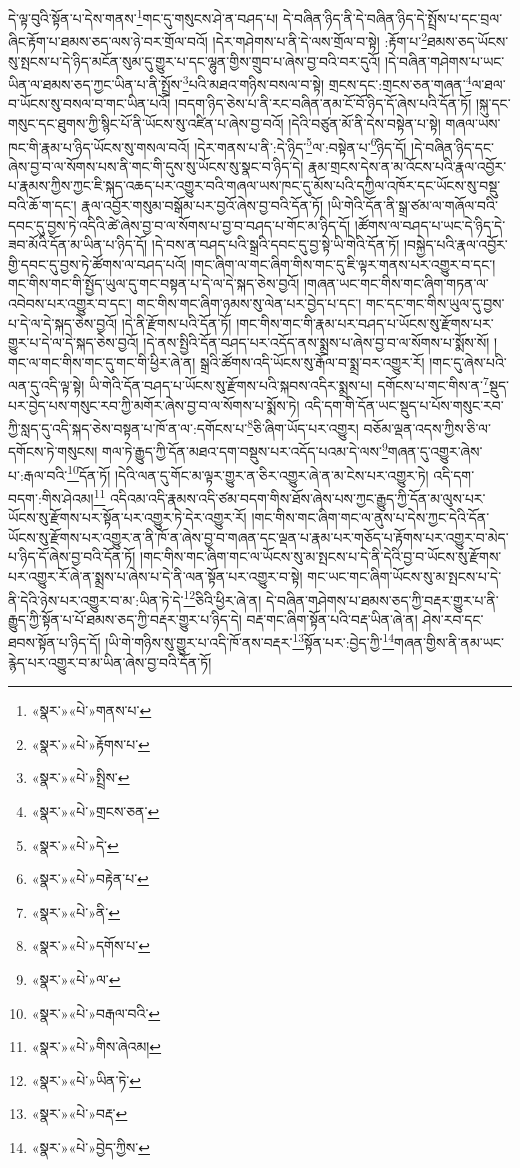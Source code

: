 དེ་ལྟ་བུའི་སྟོན་པ་དེས་གནས་\footnote{«སྣར་»«པེ་»གནས་པ་}གང་དུ་གསུངས་ཤེ་ན་བཤད་པ། དེ་བཞིན་ཉིད་ནི་དེ་བཞིན་ཉིད་དེ་སྤྲོས་པ་དང་བྲལ་ཞིང་རྟོག་པ་ཐམས་ཅད་ལས་ཉེ་བར་གྲོལ་བའོ། །དེར་གཤེགས་པ་ནི་དེ་ལས་གྲོལ་བ་སྟེ། :རྟོག་པ་\footnote{«སྣར་»«པེ་»རྟོགས་པ་}ཐམས་ཅད་ཡོངས་སུ་སྤངས་པ་དེ་ཉིད་མངོན་སུམ་དུ་གྱུར་པ་དང་ལྷུན་གྱིས་གྲུབ་པ་ཞེས་བྱ་བའི་བར་དུའོ། །དེ་བཞིན་གཤེགས་པ་ཡང་ཡིན་ལ་ཐམས་ཅད་ཀྱང་ཡིན་པ་ནི་སྤྲོས་\footnote{«སྣར་»«པེ་»སྤྲིས་}པའི་མཐའ་གཉིས་བསལ་བ་སྟེ། གྲངས་དང་:གྲངས་ཅན་གཞན་\footnote{«སྣར་»«པེ་»གྲངས་ཅན་}ལ་ཐལ་བ་ཡོངས་སུ་བསལ་བ་གང་ཡིན་པའོ། །བདག་ཉིད་ཅེས་པ་ནི་རང་བཞིན་ནམ་ངོ་བོ་ཉིད་དོ་ཞེས་པའི་དོན་ཏོ། །སྐུ་དང་གསུང་དང་ཐུགས་ཀྱི་སྙིང་པོ་ནི་ཡོངས་སུ་འཛིན་པ་ཞེས་བྱ་བའོ། །དེའི་བཙུན་མོ་ནི་དེས་བསྟེན་པ་སྟེ། གཞལ་ཡས་ཁང་གི་རྣམ་པ་ཉིད་ཡོངས་སུ་གསལ་བའོ། །དེར་གནས་པ་ནི་:དེ་ཉིད་\footnote{«སྣར་»«པེ་»དེ་}ལ་:བསྟེན་པ་\footnote{«སྣར་»«པེ་»བརྟེན་པ་}ཉིད་དོ། །དེ་བཞིན་ཉིད་དང་ཞེས་བྱ་བ་ལ་སོགས་པས་ནི་གང་གི་དུས་སུ་ཡོངས་སུ་སྣང་བ་ཉིད་དེ། རྣམ་གྲངས་དེས་ན་མ་འོངས་པའི་རྣལ་འབྱོར་པ་རྣམས་ཀྱིས་ཀྱང་ཇི་སྐད་འཆད་པར་འགྱུར་བའི་གཞལ་ཡས་ཁང་དུ་མོས་པའི་དཀྱིལ་འཁོར་དང་ཡོངས་སུ་བསྡུ་བའི་ཆོ་ག་དང་། རྣལ་འབྱོར་གསུམ་བསྒོམ་པར་བྱའོ་ཞེས་བྱ་བའི་དོན་ཏོ། །ཡི་གེའི་དོན་ནི་སྒྲ་ཙམ་ལ་གཞོལ་བའི་དབང་དུ་བྱས་ཏེ་འདིའི་ཚེ་ཞེས་བྱ་བ་ལ་སོགས་པ་བྱ་བ་བཤད་པ་གོང་མ་ཉིད་དོ། །ཚོགས་ལ་བཤད་པ་ཡང་དེ་ཉིད་དེ་ཟབ་མོའི་དོན་མ་ཡིན་པ་ཉིད་དོ། །དེ་བས་ན་བཤད་པའི་སྒྲའི་དབང་དུ་བྱ་སྟེ་ཡི་གེའི་དོན་ཏོ། །བསྐྱེད་པའི་རྣལ་འབྱོར་གྱི་དབང་དུ་བྱས་ཏེ་ཚོགས་ལ་བཤད་པའོ། །གང་ཞིག་ལ་གང་ཞིག་གིས་གང་དུ་ཇི་ལྟར་གནས་པར་འགྱུར་བ་དང་། གང་གིས་གང་གི་སྤྱོད་ཡུལ་དུ་གང་བསྟན་པ་དེ་ལ་དེ་སྐད་ཅེས་བྱའོ། །གཞན་ཡང་གང་གིས་གང་ཞིག་གཏན་ལ་འབེབས་པར་འགྱུར་བ་དང་། གང་གིས་གང་ཞིག་ཉམས་སུ་ལེན་པར་བྱེད་པ་དང་། གང་དང་གང་གིས་ཡུལ་དུ་བྱས་པ་དེ་ལ་དེ་སྐད་ཅེས་བྱའོ། །དེ་ནི་རྫོགས་པའི་དོན་ཏོ། །གང་གིས་གང་གི་རྣམ་པར་བཤད་པ་ཡོངས་སུ་རྫོགས་པར་གྱུར་པ་དེ་ལ་དེ་སྐད་ཅེས་བྱའོ། །དེ་ནས་སྤྱིའི་དོན་བཤད་པར་འདོད་ནས་སྨྲས་པ་ཞེས་བྱ་བ་ལ་སོགས་པ་སྨོས་སོ། །གང་ལ་གང་གིས་གང་དུ་གང་གི་ཕྱིར་ཞེ་ན། སྒྲའི་ཚོགས་འདི་ཡོངས་སུ་རྒོལ་བ་སྨྲ་བར་འགྱུར་རོ། །གང་དུ་ཞེས་པའི་ལན་དུ་འདི་ལྟ་སྟེ། ཡི་གེའི་དོན་བཤད་པ་ཡོངས་སུ་རྫོགས་པའི་སྐབས་འདིར་སྨྲས་པ། དགོངས་པ་གང་གིས་ན་\footnote{«སྣར་»«པེ་»ནི་}སྡུད་པར་བྱེད་པས་གསུང་རབ་ཀྱི་མགོར་ཞེས་བྱ་བ་ལ་སོགས་པ་སྨོས་ཏེ། འདི་དག་གི་དོན་ཡང་སྡུད་པ་པོས་གསུང་རབ་ཀྱི་སླད་དུ་འདི་སྐད་ཅེས་བསྟན་པ་ཁོ་ན་ལ་:དགོངས་པ་\footnote{«སྣར་»«པེ་»དགོས་པ་}ཅི་ཞིག་ཡོད་པར་འགྱུར། བཅོམ་ལྡན་འདས་ཀྱིས་ཅི་ལ་དགོངས་ཏེ་གསུངས། གལ་ཏེ་རྒྱུད་ཀྱི་དོན་མཐའ་དག་བསྡུས་པར་འདོད་པའམ་དེ་ལས་\footnote{«སྣར་»«པེ་»ལ་}གཞན་དུ་འགྱུར་ཞེས་པ་:རྒལ་བའི་\footnote{«སྣར་»«པེ་»བརྒལ་བའི་}དོན་ཏོ། །དེའི་ལན་དུ་གོང་མ་ལྟར་གྱུར་ན་ཅིར་འགྱུར་ཞེ་ན་མ་ངེས་པར་འགྱུར་ཏེ། འདི་དག་བདག་:གིས་ཤེའམ།\footnote{«སྣར་»«པེ་»གིས་ཞེའམ།} འདིའམ་འདི་རྣམས་འདི་ཙམ་བདག་གིས་ཐོས་ཞེས་པས་ཀྱང་རྒྱུད་ཀྱི་དོན་མ་ལུས་པར་ཡོངས་སུ་རྫོགས་པར་སྟོན་པར་འགྱུར་ཏེ་དེར་འགྱུར་རོ། །གང་གིས་གང་ཞིག་གང་ལ་ནུས་པ་དེས་ཀྱང་དེའི་དོན་ཡོངས་སུ་རྫོགས་པར་འགྱུར་ན་ནི་ཁོ་ན་ཞེས་བྱ་བ་གཞན་དང་ལྡན་པ་རྣམ་པར་གཅོད་པ་རྟོགས་པར་འགྱུར་བ་མེད་པ་ཉིད་དོ་ཞེས་བྱ་བའི་དོན་ཏོ། །གང་གིས་གང་ཞིག་གང་ལ་ཡོངས་སུ་མ་སྤངས་པ་དེ་ནི་དེའི་བྱ་བ་ཡོངས་སུ་རྫོགས་པར་འགྱུར་རོ་ཞེ་ན་སྨྲས་པ་ཞེས་པ་དེ་ནི་ལན་སྟོན་པར་འགྱུར་བ་སྟེ། གང་ཡང་གང་ཞིག་ཡོངས་སུ་མ་སྤངས་པ་དེ་ནི་དེའི་ཉེས་པར་འགྱུར་བ་མ་:ཡིན་ཏེ་དེ་\footnote{«སྣར་»«པེ་»ཡིན་ཏེ་}ཅིའི་ཕྱིར་ཞེ་ན། དེ་བཞིན་གཤེགས་པ་ཐམས་ཅད་ཀྱི་བརྡར་གྱུར་པ་ནི་རྒྱུད་ཀྱི་སྟོན་པ་པོ་ཐམས་ཅད་ཀྱི་བརྡར་གྱུར་པ་ཉིད་དེ། བརྡ་གང་ཞིག་སྟོན་པའི་བརྡ་ཡིན་ཞེ་ན། ཤེས་རབ་དང་ཐབས་སྟོན་པ་ཉིད་དོ། །ཡི་གེ་གཉིས་སུ་གྱུར་པ་འདི་ཁོ་ནས་བརྡར་\footnote{«སྣར་»«པེ་»བརྡ་}སྟོན་པར་:བྱེད་ཀྱི་\footnote{«སྣར་»«པེ་»བྱེད་ཀྱིས་}གཞན་གྱིས་ནི་ནམ་ཡང་རྙེད་པར་འགྱུར་བ་མ་ཡིན་ཞེས་བྱ་བའི་དོན་ཏོ། 